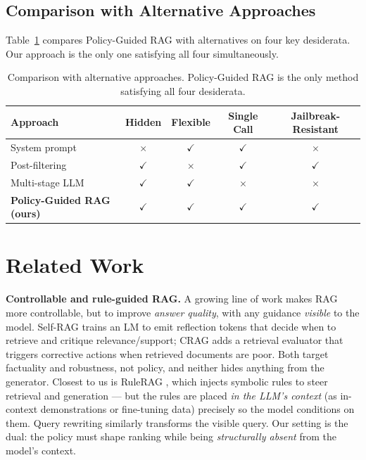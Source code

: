 \documentclass[11pt]{article}
\newcommand{\cmark}{\textcolor{green!55!black}{$\checkmark$}}
\newcommand{\xmark}{\textcolor{red!70!black}{$\times$}}
\begin{document}
\subsection{Comparison with Alternative Approaches}
Table~\ref{tab:compare} compares Policy-Guided RAG with alternatives on four key desiderata.
Our approach is the only one satisfying all four simultaneously.

\begin{table}[h]
\centering
\begin{tabular}{lcccc}
\toprule
Approach & Hidden & Flexible & Single Call & Jailbreak-Resistant \\
\midrule
System prompt            & \xmark & \cmark & \cmark & \xmark \\
Post-filtering           & \cmark & \xmark & \cmark & \cmark \\
Multi-stage LLM          & \cmark & \cmark & \xmark & \xmark \\
\textbf{Policy-Guided RAG (ours)} & \cmark & \cmark & \cmark & \cmark \\
\bottomrule
\end{tabular}
\caption{Comparison with alternative approaches. Policy-Guided RAG is the only method
satisfying all four desiderata.}
\label{tab:compare}
\end{table}

\section{Related Work}
\textbf{Controllable and rule-guided RAG.} A growing line of work makes RAG more controllable,
but to improve \emph{answer quality}, with any guidance \emph{visible} to the model. Self-RAG
\citep{asai2023selfrag} trains an LM to emit reflection tokens that decide when to retrieve and
critique relevance/support; CRAG \citep{yan2024crag} adds a retrieval evaluator that triggers
corrective actions when retrieved documents are poor. Both target factuality and robustness,
not policy, and neither hides anything from the generator. Closest to us is RuleRAG
\citep{chen2024rulerag}, which injects symbolic rules to steer retrieval and generation --- but
the rules are placed \emph{in the LLM's context} (as in-context demonstrations or fine-tuning
data) precisely so the model conditions on them. Query rewriting \citep{ma2023query} similarly
transforms the visible query. Our setting is the dual: the policy must shape ranking while being
\emph{structurally absent} from the model's context.
\end{document}
